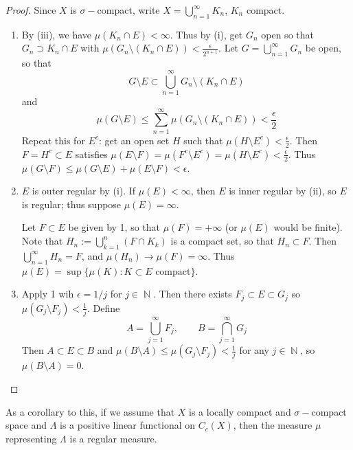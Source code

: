 \documentclass[12pt, a4paper]{book}
\DeclareMathOperator{\N}{\mathbb{N}}
\theoremstyle{nonumberplain}
\newtheorem{proof}{Proof}
\begin{document}
\begin{proof}
    Since $X$ is $\sigma-$compact, write $X=\bigcup\limits_{n=1}^\infty K_n$, $K_n$ compact.
    \begin{enumerate}[nolistsep]
        \item By (iii), we have $\mu(K_n\cap E)<\infty$.
            Thus by (i), get $G_n$ open so that $G_n\supset K_n\cap E$ with $\mu(G_n\setminus(K_n\cap E))<\frac{\epsilon}{2^{n+1}}$.
            Let $G=\bigcup\limits_{n=1}^\infty G_n$ be open, so that
            \begin{equation*}G\setminus E\subset\bigcup\limits_{n=1}^\infty G_n\setminus(K_n\cap E)\end{equation*}
            and
            \begin{equation*}
                \mu(G\setminus E)\leq\sum\limits_{n=1}^\infty\mu(G_n\setminus(K_n\cap E))<\frac{\epsilon}{2}
            \end{equation*}
            Repeat this for $E^c$: get an open set $H$ such that $\mu(H\setminus E^c)<\frac{\epsilon}{2}$.
            Then $F=H^c\subset E$ satisfies $\mu(E\setminus F)=\mu(F^c\setminus E^c)=\mu(H\setminus E^c)<\frac{\epsilon}{2}$.
            Thus $\mu(G\setminus F)\leq\mu(G\setminus E)+\mu(E\setminus F)<\epsilon$.
        \item $E$ is outer regular by (i).
            If $\mu(E)<\infty$, then $E$ is inner regular by (ii), so $E$ is regular; thus suppose $\mu(E)=\infty$.

            Let $F\subset E$ be given by 1, so that $\mu(F)=+\infty$ (or $\mu(E)$ would be finite).
            Note that $H_n:=\bigcup_{k=1}^n(F\cap K_k)$ is a compact set, so that $H_n\subset F$.
            Then $\bigcup_{n=1}^\infty H_n=F$, and $\mu(H_n)\to\mu(F)=\infty$.
            Thus $\mu(E)=\sup\{\mu(K):K\subset E\text{ compact}\}$.
        \item Apply 1 wih $\epsilon=1/j$ for $j\in\N$.
            Then there exists $F_j\subset E\subset G_j$ so $\mu(G_j\setminus F_j)<\frac{1}{j}$.
            Define
            \[A=\bigcup\limits_{j=1}^\infty F_j,\qquad B=\bigcap\limits_{j=1}^\infty G_j\]
            Then $A\subset E\subset B$ and $\mu(B\setminus A)\leq\mu(G_j\setminus F_j)<\frac{1}{j}$ for any $j\in\N$, so $\mu(B\setminus A)=0$.
    \end{enumerate}
\end{proof}
As a corollary to this, if we assume that $X$ is a locally compact and $\sigma-$compact space and $\Lambda$ is a positive linear functional on $C_c(X)$, then the measure $\mu$ representing $\Lambda$ is a regular measure.
\end{document}
